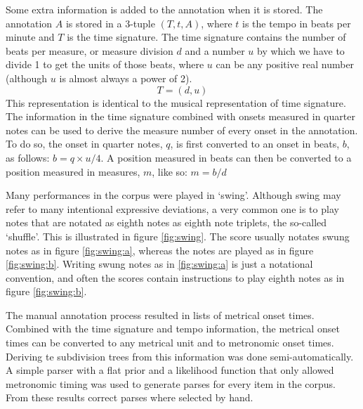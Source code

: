Some extra information is added to the annotation when it is stored. The annotation $A$ is stored in a 3-tuple $(T, t, A)$, where $t$ is the tempo in beats per minute and $T$ is the time signature. The time signature contains the number of beats per measure, or measure division $d$ and a number $u$ by which we have to divide 1 to get the units of those beats, where $u$ can be any positive real number (although $u$ is almost always a power of 2). 
\begin{equation*}
T = (d, u)
\end{equation*}
This representation is identical to the musical representation of time signature. The information in the time signature combined with onsets measured in quarter notes can be used to derive the measure number of every onset in the annotation. To do so, the onset in quarter notes, $q$, is first converted to an onset in beats, $b$, as follows: $b = q\times u/4$. A position measured in beats can then be converted to a position measured in measures, $m$, like so: $m = b/d$

Many performances in the corpus were played in `swing'. Although swing may refer to many intentional expressive deviations, a very common one is to play notes that are notated as eighth notes as eighth note triplets, the so-called `shuffle'. This is illustrated in figure \ref{fig:swing}. The score usually notates swung notes as in figure \ref{fig:swing:a}, whereas the notes are played as in figure \ref{fig:swing:b}. Writing swung notes as in \ref{fig:swing:a} is just a notational convention, and often the scores contain instructions to play eighth notes as in figure \ref{fig:swing:b}.

The manual annotation process resulted in lists of metrical onset times. Combined with the time signature and tempo information, the metrical onset times can be converted to any metrical unit and to metronomic onset times. Deriving te subdivision trees from this information was done semi-automatically. A simple parser with a flat prior and a likelihood function that only allowed metronomic timing was used to generate parses for every item in the corpus. From these results correct parses where selected by hand.


